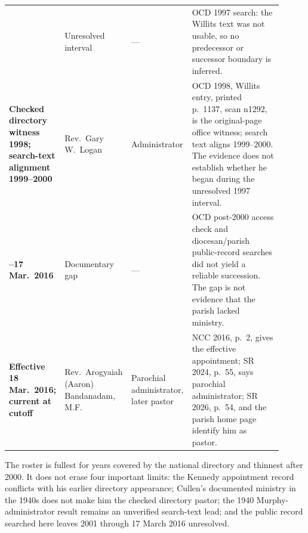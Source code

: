 \begin{longtable}{>{\bfseries\RaggedRight\arraybackslash}p{0.15\linewidth}>{\RaggedRight\arraybackslash}p{0.23\linewidth}>{\RaggedRight\arraybackslash}p{0.20\linewidth}>{\RaggedRight\arraybackslash}p{0.33\linewidth}}
1997 & Unresolved interval & --- & OCD 1997 search: the Willits text was not usable, so no predecessor or successor boundary is inferred.\\

Checked directory witness 1998; search-text alignment 1999--2000 & Rev.~Gary W.~Logan & Administrator & OCD 1998, Willits entry, printed p.~1137, scan n1292, is the original-page office witness; search text aligns 1999--2000. The evidence does not establish whether he began during the unresolved 1997 interval.\\

2001--17 Mar.~2016 & Documentary gap & --- & OCD post-2000 access check and diocesan/parish public-record searches did not yield a reliable succession. The gap is not evidence that the parish lacked ministry.\\

Effective 18 Mar.~2016; current at cutoff & Rev.~Arogyaiah (Aaron) Bandanadam, M.F. & Parochial administrator, later pastor & NCC 2016, p.~2, gives the effective appointment; SR 2024, p.~55, says parochial administrator; SR 2026, p.~54, and the parish home page identify him as pastor.\\
\end{longtable}

The roster is fullest for years covered by the national directory and thinnest
after 2000. It does not erase four important limits: the Kennedy appointment
record conflicts with his earlier directory appearance; Cullen's documented
ministry in the 1940s does not make him the checked directory pastor; the 1940
Murphy-administrator result remains an unverified search-text lead; and the
public record searched here leaves 2001 through 17 March 2016 unresolved.
